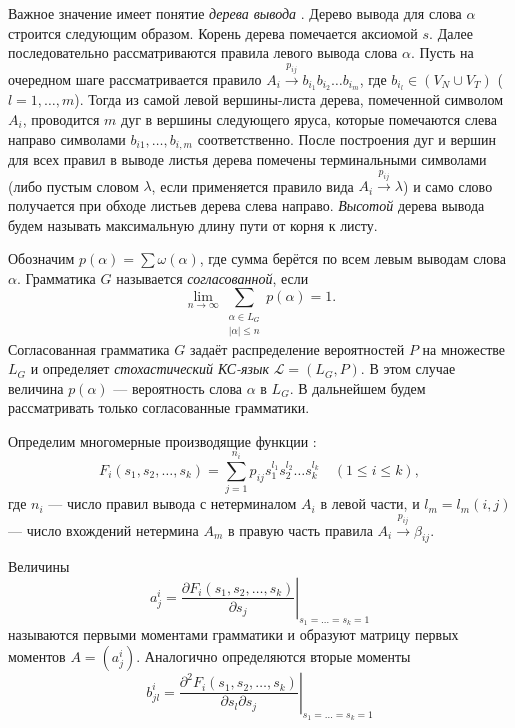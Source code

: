 \documentclass[12pt]{article}
\renewcommand{\leq}{\leqslant}
\begin{document}
Важное значение имеет понятие \textit{дерева вывода} \cite{aho-ulman-syntax}. Дерево вывода для слова $\alpha$ строится следующим образом. Корень дерева помечается аксиомой $s$. Далее последовательно рассматриваются правила левого вывода слова $\alpha$. Пусть на очередном шаге рассматривается правило $A_i \xrightarrow{p_{ij}} b_{i_1} b_{i_2} \ldots b_{i_m}$, где $b_{i_l} \in (V_N \cup V_T)$ ($l = 1,\ldots,m$). Тогда из самой левой вершины-листа дерева, помеченной символом $A_i$, проводится $m$ дуг в вершины следующего яруса, которые помечаются слева направо символами $b_{i1}, \ldots, b_{i,m}$ соответственно. После построения дуг и вершин для всех правил в выводе листья дерева помечены терминальными символами (либо пустым словом $\lambda$, если применяется правило вида $A_i \xrightarrow{p_{ij}} \lambda$) и само слово получается при обходе листьев дерева слева направо. \textit{Высотой} дерева вывода будем называть максимальную длину пути от корня к листу.

Обозначим $p(\alpha) = \sum \omega(\alpha)$, где сумма берётся по всем левым выводам слова $\alpha$. Грамматика $G$ называется \textit{согласованной}, если
\begin{equation}
\label{eq:soglas}
	\lim_{n \rightarrow \infty} \sum_{\substack{\alpha \in L_G\\\left|\alpha\right| \leq n}} p(\alpha) = 1.
\end{equation}
Согласованная грамматика $G$ задаёт распределение вероятностей $P$ на множестве $L_G$ и определяет \textit{стохастический КС-язык} $\mathcal{L} = (L_G, P)$. В этом случае величина $p(\alpha)$ --- вероятность слова $\alpha$ в $L_G$. В дальнейшем будем рассматривать только согласованные грамматики.

Определим многомерные производящие функции \cite{fu-struct}:
\begin{equation}
\label{eq:f-def}
	F_i(s_1, s_2, \ldots, s_k) = \sum_{j = 1}^{n_i} p_{ij} s_1^{l_1} s_2^{l_2} \ldots s_k^{l_k}\quad (1 \leq i \leq k),
\end{equation}
где $n_i$ --- число правил вывода с нетерминалом $A_i$ в левой части, и $l_m = l_m(i,j)$ --- число вхождений нетермина $A_m$ в правую часть правила $A_i \xrightarrow{p_{ij}} \beta_{ij}$.

Величины
\begin{equation}
\label{eq:aij-definition}
	a^i_j = \left. \frac{\partial F_i(s_1, s_2, \ldots, s_k)}{\partial s_j} \right|_{s_1 = \ldots = s_k = 1}
\end{equation}
называются первыми моментами грамматики и образуют матрицу первых моментов $A = (a^i_j)$. Аналогично определяются вторые моменты
\begin{equation}
\label{eq:bij-definition}
	b^i_{jl} = \left. \frac{\partial^2 F_i(s_1, s_2, \ldots, s_k)}{\partial s_l \partial s_j} \right|_{s_1 = \ldots = s_k = 1}
\end{equation}
\end{document}
